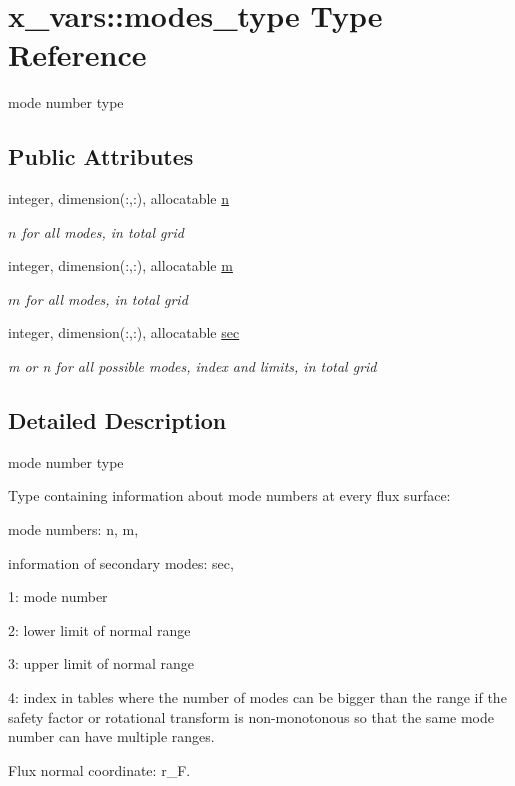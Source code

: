 \hypertarget{structx__vars_1_1modes__type}{}\section{x\+\_\+vars\+:\+:modes\+\_\+type Type Reference}
\label{structx__vars_1_1modes__type}


mode number type  


\subsection*{Public Attributes}
\begin{DoxyCompactItemize}
\item 
integer, dimension(\+:,\+:), allocatable \hyperlink{structx__vars_1_1modes__type_ab6d49ba52a26dd5d76685cc605e16ec0}{n}
\begin{DoxyCompactList}\small\item\em $n$ for all modes, in total grid \end{DoxyCompactList}\item 
integer, dimension(\+:,\+:), allocatable \hyperlink{structx__vars_1_1modes__type_a75bcb0fb494d2e896553502ab67499ff}{m}
\begin{DoxyCompactList}\small\item\em $m$ for all modes, in total grid \end{DoxyCompactList}\item 
integer, dimension(\+:,\+:), allocatable \hyperlink{structx__vars_1_1modes__type_acf880c5c3f78457cd4d40a3adf410eb7}{sec}
\begin{DoxyCompactList}\small\item\em {\ttfamily m} or {\ttfamily n} for all possible modes, index and limits, in total grid \end{DoxyCompactList}\end{DoxyCompactItemize}


\subsection{Detailed Description}
mode number type 

Type containing information about mode numbers at every flux surface\+:
\begin{DoxyItemize}
\item mode numbers\+: {\ttfamily n}, {\ttfamily m},
\item information of secondary modes\+: {\ttfamily sec},
\begin{DoxyItemize}
\item 1\+: mode number
\item 2\+: lower limit of normal range
\item 3\+: upper limit of normal range
\item 4\+: index in tables where the number of modes can be bigger than the range if the safety factor or rotational transform is non-\/monotonous so that the same mode number can have multiple ranges.
\end{DoxyItemize}
\item Flux normal coordinate\+: {\ttfamily r\+\_\+F}.
\end{DoxyItemize}

